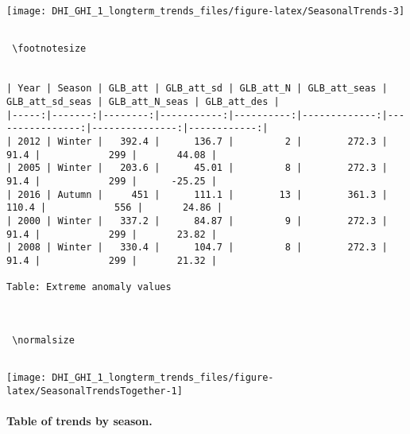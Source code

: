 \documentclass[
  10pt,
  a4paper,oneside]{article}
\begin{document}
\begin{center}\texttt{[image: DHI\_GHI\_1\_longterm\_trends\_files/figure-latex/SeasonalTrends-3]} \end{center}

\begin{verbatim}
 
 \footnotesize 
 

| Year | Season | GLB_att | GLB_att_sd | GLB_att_N | GLB_att_seas | GLB_att_sd_seas | GLB_att_N_seas | GLB_att_des |
|-----:|-------:|--------:|-----------:|----------:|-------------:|----------------:|---------------:|------------:|
| 2012 | Winter |   392.4 |      136.7 |         2 |        272.3 |            91.4 |            299 |       44.08 |
| 2005 | Winter |   203.6 |      45.01 |         8 |        272.3 |            91.4 |            299 |      -25.25 |
| 2016 | Autumn |     451 |      111.1 |        13 |        361.3 |           110.4 |            556 |       24.86 |
| 2000 | Winter |   337.2 |      84.87 |         9 |        272.3 |            91.4 |            299 |       23.82 |
| 2008 | Winter |   330.4 |      104.7 |         8 |        272.3 |            91.4 |            299 |       21.32 |

Table: Extreme anomaly values


 
 \normalsize 
 
\end{verbatim}

\begin{center}\texttt{[image: DHI\_GHI\_1\_longterm\_trends\_files/figure-latex/SeasonalTrendsTogether-1]} \end{center}

\newpage
\FloatBarrier

\hypertarget{table-of-trends-by-season.}{%
\paragraph{Table of trends by season.}\label{table-of-trends-by-season.}}
\end{document}
